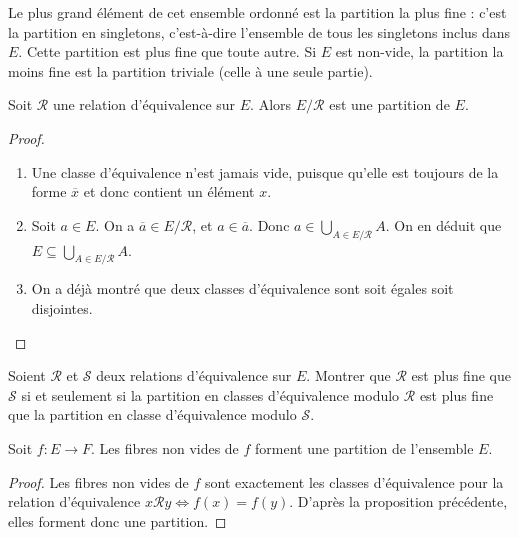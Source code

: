 \begin{remarque}
Le plus grand élément de cet ensemble ordonné est la partition la  plus fine : c'est la partition en singletons, c'est-à-dire l'ensemble de tous les singletons inclus dans $E$. Cette partition est plus fine que toute autre. Si $E$ est non-vide, la partition la moins fine est la partition triviale (celle à une seule partie).  
\end{remarque}



\begin{proposition}\label{prop-classes-partition}
Soit $\mathcal R$ une relation d'équivalence sur $E$. Alors $E/\mathcal R$ est une partition de $E$.
\end{proposition}
\begin{proof}
\begin{enumerate}
\item Une classe d'équivalence n'est jamais vide, puisque qu'elle est toujours de la forme $\overline{x}$ et donc contient un élément $x$.
\item Soit $a\in E$. On a $\overline{a} \in E/\mathcal R$, et $a\in \overline{a}$. Donc $a\in \bigcup_{A\in E/\mathcal R} A$. On en déduit que $E\subseteq \bigcup_{A\in E/\mathcal R} A$.
\item On a déjà montré que deux classes d'équivalence sont soit égales soit disjointes.
\end{enumerate}
\end{proof}

\begin{exercice}
Soient $\mathcal R$ et $\mathcal S$ deux relations d'équivalence sur $E$. Montrer que $\mathcal R$ est plus fine que $\mathcal S$ si et seulement si la partition en classes d'équivalence modulo $\mathcal R$ est plus fine que la partition en classe d'équivalence modulo $\mathcal S$.
\end{exercice}

\begin{proposition}\label{prop-fibres-partition}
Soit $f : E\to F$. Les fibres non vides de $f$ forment une partition de l'ensemble $E$.
\end{proposition}
\begin{proof}
Les fibres non vides de $f$ sont exactement les classes d'équivalence pour la relation d'équivalence $x\mathcal R y \iff f(x)=f(y)$. D'après la proposition précédente, elles forment donc une partition.
\end{proof}

